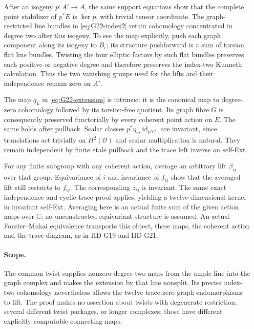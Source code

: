 After an isogeny \(p:A'\to A\), the same support equations show
that the complete point stabilizer of \(p^*E\) is \(\ker p\),
with trivial tensor coordinate. The graph-restricted line bundles
in \eqref{eq:G22-index2} retain cohomology concentrated in degree
two after this isogeny. To see the map explicitly, push each graph
component along its isogeny to \(B_\epsilon\); its structure
pushforward is a sum of torsion flat line bundles. Twisting the four
elliptic factors by such flat bundles preserves each positive or
negative degree and therefore preserves the index-two Kunneth
calculation. Thus the two vanishing groups used for the lifts and
their independence remain zero on \(A'\).

The map \(q_L\) in \eqref{eq:G22-extension} is intrinsic: it is
the canonical map to degree-zero cohomology followed by its
torsion-free quotient. Its graph fibre \(G\) is consequently
preserved functorially by every coherent point action on \(E\).
The same holds after pullback. Scalar classes
\(p^*\eta_{ij}\operatorname{id}_{p^*G}\) are invariant, since
translations act trivially on \(H^2(\mathcal O)\) and scalar
multiplication is natural. They remain independent by finite etale
pullback and the trace left inverse on self-Ext.

For any finite subgroup with any coherent action, average an arbitrary
lift \(\beta_{ij}\) over that group. Equivariance of \(i\) and
invariance of \(f_{ij}\) show that the averaged lift still restricts
to \(f_{ij}\). The corresponding \(z_{ij}\) is invariant.
The same exact independence and cyclic-trace proof applies, yielding
a twelve-dimensional kernel in invariant self-Ext. Averaging here
is an actual finite sum of the given action maps over \(\mathbb C\);
no unconstructed equivariant structure is assumed. An actual
Fourier--Mukai equivalence transports this object, these maps, the
coherent action and the trace diagram, as in HD-G19 and HD-G21.

\paragraph{Scope.}
The common twist supplies nonzero degree-two maps from the ample
line into the graph complex and makes the extension by that line
nonsplit. Its precise index-two cohomology nevertheless allows the
twelve trace-zero graph endomorphisms to lift. The proof makes no
assertion about twists with degenerate restriction, several different
twist packages, or longer complexes; those have different explicitly
computable connecting maps.

